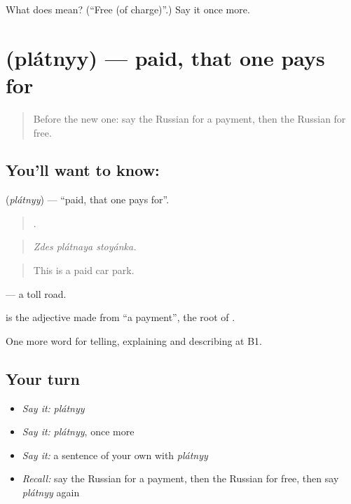 \begin{tcolorbox}[breakable,colback=teal!4,colframe=teal!35!black,title={Before you move on}]
What does  mean? (\textquotedblleft{}Free (of charge)\textquotedblright{}.) Say it once more.
\end{tcolorbox}
\section[\texorpdfstring{\ru{платный} (plátnyy)}{платный (plátnyy)}]{ (plátnyy) — paid, that one pays for}

\label{lesson:RU-C397-platnyy}



\begin{quote}
Before the new one: say the Russian for a payment, then the Russian for free.
\end{quote}

\subsection*{You'll want to know: }
\textbf{} (\emph{plátnyy}) — \textquotedblleft{}paid, that one pays for\textquotedblright{}.

\begin{quote}
  .
\end{quote}

\begin{quote}
\emph{Zdes plátnaya stoyánka.}
\end{quote}

\begin{quote}
This is a paid car park.
\end{quote}

\emph{ } — a toll road.

\begin{cousinweb}
\textbf{} is the adjective made from \emph{} \textquotedblleft{}a payment\textquotedblright{}, the root of \emph{}.
\end{cousinweb}

\begin{grammarlens}[title={What you've built}]
One more word for telling, explaining and describing at B1.
\end{grammarlens}

\subsection*{Your turn}
\begin{itemize}
\raggedright
  \item \emph{Say it:} \emph{plátnyy}
  \item \emph{Say it:} \emph{plátnyy}, once more
  \item \emph{Say it:} a sentence of your own with \emph{plátnyy}
  \item \emph{Recall:} say the Russian for a payment, then the Russian for free, then say \emph{plátnyy} again
\end{itemize}

